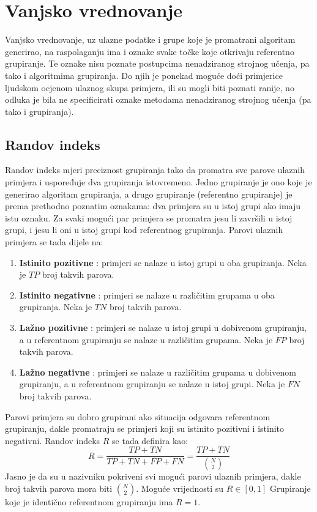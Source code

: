 \documentclass[times, utf8, zavrsni]{fer}
\begin{document}
\section{Vanjsko vrednovanje}
Vanjsko vrednovanje, uz ulazne podatke i grupe koje je promatrani algoritam generirao, na raspolaganju ima i oznake svake točke koje otkrivaju referentno grupiranje. Te oznake nisu poznate postupcima nenadziranog strojnog učenja, pa tako i algoritmima grupiranja. Do njih je ponekad moguće doći primjerice ljudskom ocjenom ulaznog skupa primjera, ili su mogli biti poznati ranije, no odluka je bila ne specificirati oznake metodama nenadziranog strojnog učenja (pa tako i grupiranja).


\subsection{Randov indeks}
Randov indeks mjeri preciznost grupiranja tako da promatra sve parove ulaznih primjera i uspoređuje dva grupiranja istovremeno. Jedno grupiranje je ono koje je generirao algoritam grupiranja, a drugo grupiranje (referentno grupiranje) je prema prethodno poznatim oznakama: dva primjera su u istoj grupi ako imaju istu oznaku. Za svaki mogući par primjera se promatra jesu li završili u istoj grupi, i jesu li oni u istoj grupi kod referentnog grupiranja. Parovi ulaznih primjera se tada dijele na:
\begin{enumerate}
    \item \textbf{Istinito pozitivne} : primjeri se nalaze u istoj grupi u oba grupiranja. Neka je $TP$ broj takvih parova.
    \item \textbf{Istinito negativne} : primjeri se nalaze u različitim grupama u oba grupiranja. Neka je $TN$ broj takvih parova.
    \item \textbf{Lažno pozitivne} : primjeri se nalaze u istoj grupi u dobivenom grupiranju, a u referentnom grupiranju se nalaze u različitim grupama. Neka je $FP$ broj takvih parova.
    \item \textbf{Lažno negativne} : primjeri se nalaze u različitim grupama u dobivenom grupiranju, a u referentnom grupiranju se nalaze u istoj grupi. Neka je $FN$ broj takvih parova.
\end{enumerate}

Parovi primjera su dobro grupirani ako situacija odgovara referentnom grupiranju, dakle promatraju se primjeri koji su istinito pozitivni i istinito negativni.
Randov indeks $R$ se tada definira kao:
\[R = \frac{TP + TN}{TP + TN + FP + FN} = \frac{TP + TN}{\binom{N}{2}}\]
Jasno je da su u nazivniku pokriveni svi mogući parovi ulaznih primjera, dakle broj takvih parova mora biti $\binom{N}{2}$. Moguće vrijednosti su $R \in \left[0, 1\right]$
Grupiranje koje je identično referentnom grupiranju ima $R = 1$.
\end{document}
